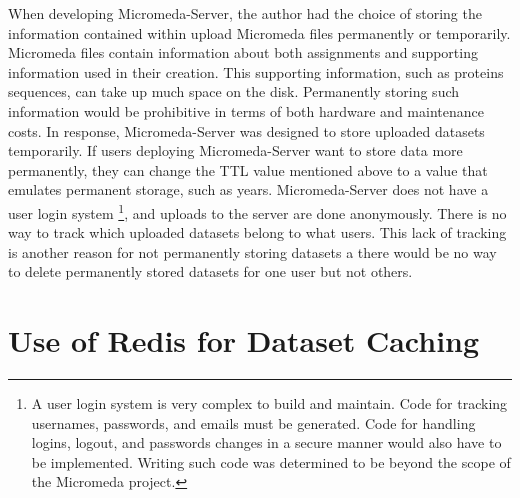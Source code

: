 When developing Micromeda-Server, the author had the choice of storing the information contained within upload Micromeda files permanently or temporarily. Micromeda files contain information about both assignments and supporting information used in their creation. This supporting information, such as proteins sequences, can take up much space on the disk. Permanently storing such information would be prohibitive in terms of both hardware and maintenance costs. In response, Micromeda-Server was designed to store uploaded datasets temporarily. If users deploying Micromeda-Server want to store data more permanently, they can change the TTL value mentioned above to a value that emulates permanent storage, such as years. Micromeda-Server does not have a user login system \footnote{A user login system is very complex to build and maintain. Code for tracking usernames, passwords, and emails must be generated. Code for handling logins, logout, and passwords changes in a secure manner would also have to be implemented. Writing such code was determined to be beyond the scope of the Micromeda project.}, and uploads to the server are done anonymously. There is no way to track which uploaded datasets belong to what users. This lack of tracking is another reason for not permanently storing datasets a there would be no way to delete permanently stored datasets for one user but not others.

\section{Use of Redis for Dataset Caching} \label{redis-caching}


